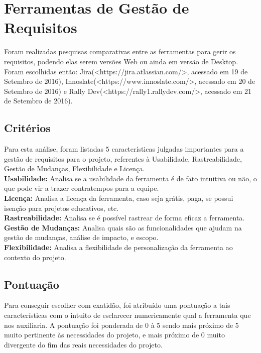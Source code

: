 \chapter[Ferramentas de Gestão de Requisitos]{Ferramentas de Gestão de Requisitos}

\tab Foram realizadas pesquisas comparativas entre as ferramentas para gerir os requisitos, podendo elas serem versões Web ou ainda em versão de Desktop. Foram escolhidas então: Jira(<https://jira.atlassian.com/>, acessado em 19 de Setembro de 2016), Innoslate(<https://www.innoslate.com/>, acessado em 20 de Setembro de 2016) e Rally Dev(<https://rally1.rallydev.com/>, acessado em 21 de Setembro de 2016).\\

\section {\large{Critérios}}

\tab Para esta análise, foram listadas 5 características julgadas importantes para a gestão de requisitos para o projeto, referentes à Usabilidade, Rastreabilidade, Gestão de Mudanças, Flexibilidade e Licença.\\
\tab \textbf{Usabilidade:} Analisa se a usabilidade da ferramenta é de fato intuitiva ou não, o que pode vir a trazer contratempos para a equipe.\\
\tab \textbf{Licença:} Analisa a licença da ferramenta, caso seja grátis, paga, se possui isenção para projetos educativos, etc.\\
\tab \textbf{Rastreabilidade:} Analisa se é possível rastrear de forma eficaz a ferramenta.\\
\tab \textbf{Gestão de Mudanças:} Analisa quais são as funcionalidades que ajudam na gestão de mudanças, análise de impacto, e escopo.\\
\tab \textbf{Flexibilidade:} Analisa a flexibilidade de personalização da ferramenta ao contexto do projeto.\\

\section {\large{Pontuação}}

\tab Para conseguir escolher com exatidão, foi atribuído uma pontuação a tais características com o intuito de esclarecer numericamente qual a ferramenta que nos auxiliaria. A pontuação foi ponderada de 0 à 5 sendo mais próximo de 5 muito pertinente às necessidades do projeto, e mais próximo de 0 muito divergente do fim das reais necessidades do projeto.\\

